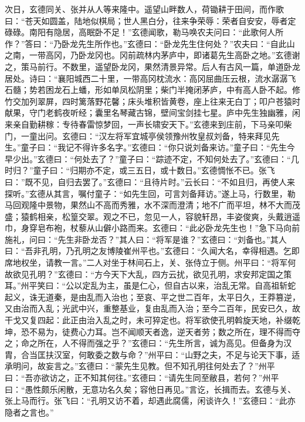 次日，玄德同关、张并从人等来隆中。遥望山畔数人，荷锄耕于田间，而作歌曰：“苍天如圆盖，陆地似棋局；世人黑白分，往来争荣辱：荣者自安安，辱者定碌碌。南阳有隐居，高眠卧不足！”玄德闻歌，勒马唤农夫问曰：“此歌何人所作？”答曰：“乃卧龙先生所作也。”玄德曰：“卧龙先生住何处？”农夫曰：“自此山之南，一带高冈，乃卧龙冈也。冈前疏林内茅庐中，即诸葛先生高卧之地。”玄德谢之，策马前行。不数里，遥望卧龙冈，果然清景异常。后人有古风一篇，单道卧龙居处。诗曰：“襄阳城西二十里，一带高冈枕流水：高冈屈曲压云根，流水潺潺飞石髓；势若困龙石上蟠，形如单凤松阴里；柴门半掩闭茅庐，中有高人卧不起。修竹交加列翠屏，四时篱落野花馨；床头堆积皆黄卷，座上往来无白丁；叩户苍猿时献果，守门老鹤夜听经；囊里名琴藏古锦，壁间宝剑挂七星。庐中先生独幽雅，闲来亲自勤耕稼：专待春雷惊梦回，一声长啸安天下。”玄德来到庄前，下马亲叩柴门，一童出问。玄德曰：“汉左将军宜城亭侯领豫州牧皇叔刘备，特来拜见先生。”童子曰：“我记不得许多名字。”玄德曰：“你只说刘备来访。”童子曰：“先生今早少出。”玄德曰：“何处去了？”童子曰：“踪迹不定，不知何处去了。”玄德曰：“几时归？”童子曰：“归期亦不定，或三五日，或十数日。”玄德惆怅不已。张飞曰：”既不见，自归去罢了。”玄德曰：“且待片时。”云长曰：“不如且归，再使人来探听。”玄德从其言，嘱付童子：“如先生回，可言刘备拜访。”遂上马，行数里，勒马回观隆中景物，果然山不高而秀雅，水不深而澄清；地不广而平坦，林不大而茂盛；猿鹤相亲，松篁交翠。观之不已，忽见一人，容貌轩昂，丰姿俊爽，头戴逍遥巾，身穿皂布袍，杖藜从山僻小路而来。玄德曰：“此必卧龙先生也！”急下马向前施礼，问曰：“先生非卧龙否？”其人曰：“将军是谁？”玄德曰：“刘备也。”其人曰：“吾非孔明，乃孔明之友博陵崔州平也。”玄德曰：“久闻大名，幸得相遇。乞即席地权坐，请教一言。”二人对坐于林间石上，关、张侍立于侧。州平曰：“将军何故欲见孔明？”玄德曰：“方今天下大乱，四方云扰，欲见孔明，求安邦定国之策耳。”州平笑曰：“公以定乱为主，虽是仁心，但自古以来，治乱无常。自高祖斩蛇起义，诛无道秦，是由乱而入治也；至哀、平之世二百年，太平日久，王莽篡逆，又由治而入乱；光武中兴，重整基业，复由乱而入治；至今二百年，民安已久，故干戈又复四起：此正由治入乱之时，未可猝定也。将军欲使孔明斡旋天地，补缀乾坤，恐不易为，徒费心力耳。岂不闻顺天者逸，逆天者劳；数之所在，理不得而夺之；命之所在，人不得而强之乎？”玄德曰：“先生所言，诚为高见。但备身为汉胄，合当匡扶汉室，何敢委之数与命？”州平曰：“山野之夫，不足与论天下事，适承明问，故妄言之。”玄德曰：“蒙先生见教。但不知孔明往何处去了？”州平曰：“吾亦欲访之，正不知其何往。”玄德曰：“请先生同至敝县，若何？”州平曰：“愚性颇乐闲散，无意功名久矣；容他日再见。”言讫，长揖而去。玄德与关、张上马而行。张飞曰：“孔明又访不着，却遇此腐儒，闲谈许久！”玄德曰：“此亦隐者之言也。”


